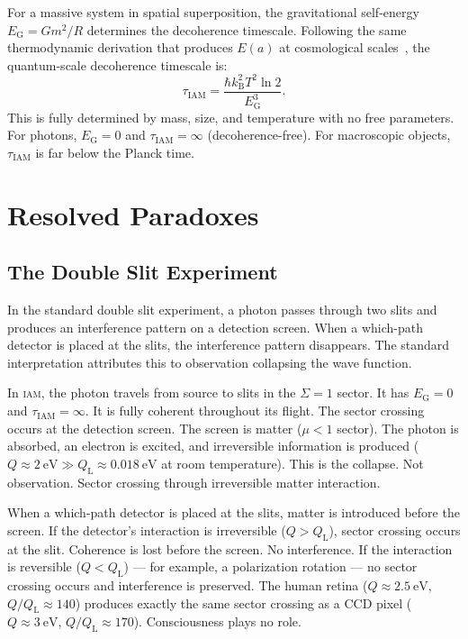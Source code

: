 \documentclass[12pt,letterpaper]{article}
\newcommand{\IAM}{\textsc{iam}}
\newcommand{\kB}{k_{\mathrm{B}}}
\newcommand{\QL}{Q_{\mathrm{L}}}
\newcommand{\EG}{E_{\mathrm{G}}}
\newcommand{\tauIAM}{\tau_{\mathrm{IAM}}}
\begin{document}
For a massive system in spatial superposition, the gravitational
self-energy $\EG = Gm^2/R$ determines the decoherence timescale.
Following the same thermodynamic derivation that produces $E(a)$ at
cosmological scales~\citep{Mahaffey2026decoherence}, the quantum-scale
decoherence timescale is:
\begin{equation}
    \tauIAM = \frac{\hbar \kB^2 T^2 \ln 2}{\EG^3}.
    \label{eq:tau}
\end{equation}
This is fully determined by mass, size, and temperature with no free
parameters. For photons, $\EG = 0$ and $\tauIAM = \infty$
(decoherence-free). For macroscopic objects, $\tauIAM$ is far below
the Planck time.

\section{Resolved Paradoxes}

\subsection{The Double Slit Experiment}

In the standard double slit experiment, a photon passes through two
slits and produces an interference pattern on a detection screen. When a
which-path detector is placed at the slits, the interference pattern
disappears. The standard interpretation attributes this to observation
collapsing the wave function.

In \IAM, the photon travels from source to slits in the $\Sigma = 1$
sector. It has $\EG = 0$ and $\tauIAM = \infty$. It is fully coherent
throughout its flight. The sector crossing occurs at the detection
screen. The screen is matter ($\mu < 1$ sector). The photon is absorbed,
an electron is excited, and irreversible information is produced
($Q \approx 2~\text{eV} \gg \QL \approx 0.018~\text{eV}$ at room
temperature). This is the collapse. Not observation. Sector crossing
through irreversible matter interaction.

When a which-path detector is placed at the slits, matter is introduced
before the screen. If the detector's interaction is irreversible
($Q > \QL$), sector crossing occurs at the slit. Coherence is lost
before the screen. No interference. If the interaction is reversible
($Q < \QL$) --- for example, a polarization rotation --- no sector
crossing occurs and interference is preserved. The human retina
($Q \approx 2.5~\text{eV}$, $Q/\QL \approx 140$) produces exactly the
same sector crossing as a CCD pixel ($Q \approx 3~\text{eV}$,
$Q/\QL \approx 170$). Consciousness plays no role.
\end{document}
